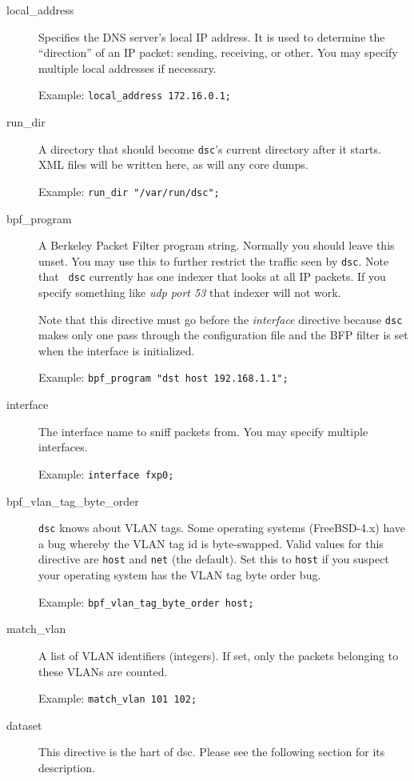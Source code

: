 \documentclass{report}
\def\dsc{{\sc dsc}}
\begin{document}
\begin{description}

\item[local\_address]

	Specifies the DNS server's local IP address.  It is used
	to determine the ``direction'' of an IP packet: sending,
	receiving, or other.  You may specify multiple local addresses
	if necessary.

	Example: {\tt local\_address 172.16.0.1;\/}

\item[run\_dir]

	A directory that should become {\tt dsc\/}'s current directory
	after it starts.  XML files will be written here, as will
	any core dumps.

	Example: {\tt run\_dir "/var/run/dsc";\/}

\item[bpf\_program]

	A Berkeley Packet Filter program string.  Normally you
	should leave this unset.  You may use this to further
	restrict the traffic seen by {\tt dsc\/}.  Note that {\tt
	dsc\/} currently has one indexer that looks at all IP
	packets.  If you specify something like {\em udp port 53\/}
	that indexer will not work.

	Note that this directive must go before the {\em interface\/}
	directive because {\tt dsc\/} makes only one pass through
	the configuration file and the BFP filter is set when the
	interface is initialized.

	Example: {\tt bpf\_program "dst host 192.168.1.1";\/}

\item[interface]

	The interface name to sniff packets from.   You may specify multiple
	interfaces.

	Example: {\tt interface fxp0;\/}

\item[bpf\_vlan\_tag\_byte\_order]

	{\tt dsc\/} knows about VLAN tags.  Some operating systems (FreeBSD-4.x) have a bug
	whereby the VLAN tag id is byte-swapped.  Valid values for this directive
	are {\tt host\/} and {\tt net\/} (the default).    Set this to {\tt host\/}
	if you suspect your operating system has the VLAN tag byte order bug.

	Example: {\tt bpf\_vlan\_tag\_byte\_order host;\/}

\item[match\_vlan]

	A list of VLAN identifiers (integers).  If set, only the packets belonging to these
	VLANs are counted.

	Example: {\tt match\_vlan 101 102;\/}

\item[dataset]

	This directive is the hart of {\dsc}.  Please see the following section for its description.

\end{description}
\end{document}
